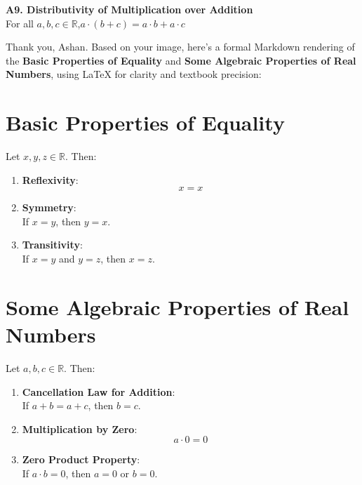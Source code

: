 \documentclass[
]{book}
\theoremstyle{definition}
\theoremstyle{definition}
\theoremstyle{definition}
\theoremstyle{definition}
\theoremstyle{remark}
\begin{document}
\textbf{A9. Distributivity of Multiplication over Addition}\\
For all \(a, b, c \in \mathbb{R}\),\(a \cdot (b + c) = a \cdot b + a \cdot c\)

Thank you, Ashan. Based on your image, here's a formal Markdown rendering of the \textbf{Basic Properties of Equality} and \textbf{Some Algebraic Properties of Real Numbers}, using LaTeX for clarity and textbook precision:

\section{Basic Properties of Equality}\label{basic-properties-of-equality}

Let \(x, y, z \in \mathbb{R}\). Then:

\begin{enumerate}
\def\labelenumi{\arabic{enumi}.}
\item
  \textbf{Reflexivity}:\\
  \[
  x = x
  \]
\item
  \textbf{Symmetry}:\\
  If \(x = y\), then \(y = x\).
\item
  \textbf{Transitivity}:\\
  If \(x = y\) and \(y = z\), then \(x = z\).
\end{enumerate}

\section{Some Algebraic Properties of Real Numbers}\label{some-algebraic-properties-of-real-numbers}

Let \(a, b, c \in \mathbb{R}\). Then:

\begin{enumerate}
\def\labelenumi{\roman{enumi}.}
\item
  \textbf{Cancellation Law for Addition}:\\
  If \(a + b = a + c\), then \(b = c\).
\item
  \textbf{Multiplication by Zero}:\\
  \[
     a \cdot 0 = 0
     \]
\item
  \textbf{Zero Product Property}:\\
  If \(a \cdot b = 0\), then \(a = 0\) or \(b = 0\).
\end{enumerate}
\end{document}
